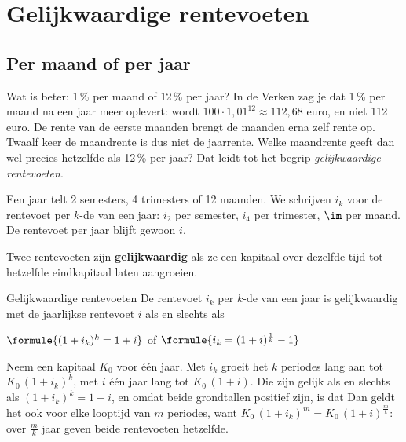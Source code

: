 
\begin{oefeningen}

\end{oefeningen}

\section{Gelijkwaardige rentevoeten}

\subsection{Per maand of per jaar}

Wat is beter: 1\,\% per maand of 12\,\% per jaar? In de Verken zag je dat 1\,\% per maand na een jaar meer oplevert:  wordt $100 \cdot 1{,}01^{12} \approx 112{,}68$ euro, en niet 112 euro. De rente van de eerste maanden brengt de maanden erna zelf rente op. Twaalf keer de maandrente is dus niet de jaarrente. Welke maandrente geeft dan wel precies hetzelfde als 12\,\% per jaar? Dat leidt tot het begrip \textit{gelijkwaardige rentevoeten}.

Een jaar telt 2 semesters, 4 trimesters of 12 maanden. We schrijven $i_k$ voor de rentevoet per $k$-de van een jaar: $i_2$ per semester, $i_4$ per trimester, $\im$ per maand. De rentevoet per jaar blijft gewoon $i$.

\begin{theorie}
Twee rentevoeten zijn \textbf{\textcolor{accent}{gelijkwaardig}} als ze een kapitaal over dezelfde tijd tot hetzelfde eindkapitaal laten aangroeien.

\begin{stelling}{Gelijkwaardige rentevoeten}
De rentevoet $i_k$ per $k$-de van een jaar is gelijkwaardig met de jaarlijkse rentevoet $i$ als en slechts als

\vspace{1mm}
\qquad $\formule{(1 + i_k)^k = 1 + i}$ \qquad of \qquad $\formule{i_k = (1 + i)^{\frac1k} - 1}$
\end{stelling}

\begin{bewijs}
Neem een kapitaal $K_0$ voor één jaar. Met $i_k$ groeit het $k$ periodes lang aan tot $K_0\,(1 + i_k)^k$, met $i$ één jaar lang tot $K_0\,(1 + i)$. Die zijn gelijk als en slechts als $(1 + i_k)^k = 1 + i$, en omdat beide grondtallen positief zijn, is dat
Dan geldt het ook voor elke looptijd van $m$ periodes, want $K_0\,(1 + i_k)^m = K_0\,(1 + i)^{\frac{m}{k}}$: over $\frac mk$ jaar geven beide rentevoeten hetzelfde.
\end{bewijs}
\end{theorie}

